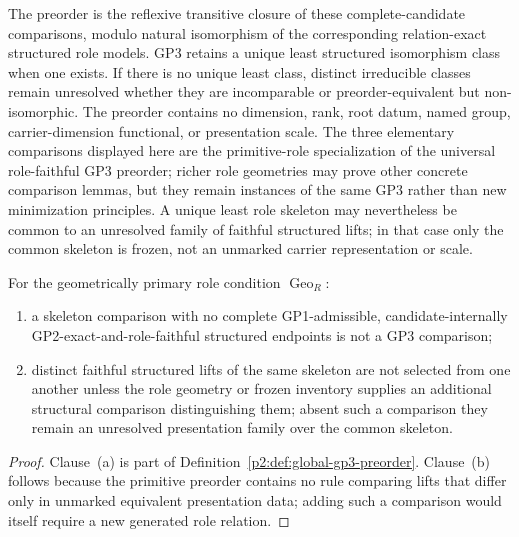 \documentclass[12pt,a4paper]{article}
\begin{document}
\begin{definition}
The preorder is the reflexive transitive closure of these complete-candidate
comparisons,
modulo natural isomorphism of the corresponding relation-exact structured
role models.  GP3 retains a unique least structured isomorphism class when one
exists.  If there is no unique least class, distinct irreducible classes remain
unresolved whether they are incomparable or preorder-equivalent but
non-isomorphic.  The preorder contains no dimension, rank, root datum, named
group, carrier-dimension functional, or presentation scale.  The three
elementary comparisons displayed here are the primitive-role specialization of
the universal role-faithful GP3 preorder; richer role geometries may prove
other concrete comparison lemmas, but they remain instances of the same GP3
rather than new minimization principles.  A unique least role skeleton may
nevertheless be common to an unresolved family of faithful structured lifts;
in that case only the common skeleton is frozen, not an unmarked carrier
representation or scale.
\end{definition}

\begin{lemma}
\label{p2:lem:skeleton-factorization}
For the geometrically primary role condition \(\operatorname{Geo}_R\):
\begin{enumerate}[label=(\alph*),leftmargin=2em]
\item a skeleton comparison with no complete GP1-admissible,
candidate-internally GP2-exact-and-role-faithful structured endpoints is not a
GP3 comparison;
\item distinct faithful structured lifts of the same skeleton are not selected
from one another unless the role geometry or frozen inventory supplies an
additional structural comparison distinguishing them; absent such a comparison they remain an
unresolved presentation family over the common skeleton.
\end{enumerate}
\end{lemma}

\begin{proof}
Clause~(a) is part of Definition~\ref{p2:def:global-gp3-preorder}.  Clause~(b)
follows because the primitive preorder contains no rule comparing lifts that
differ only in unmarked equivalent presentation data; adding such a comparison
would itself require a new generated role relation.
\end{proof}
\end{document}
